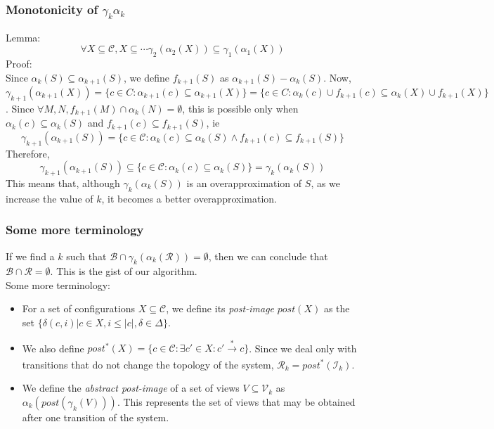 \documentclass{beamer}
\begin{document}
{        \begin{frame}
            \frametitle{Monotonicity of $\gamma_{k}\alpha_{k}$}
            Lemma:
            \begin{equation*}
                \forall X \subseteq \mathcal{C}, X \subseteq \cdots \gamma_{2}(\alpha_{2}(X)) \subseteq \gamma_{1}(\alpha_{1}(X))
            \end{equation*}
            Proof:\\
            Since $\alpha_{k}(S) \subseteq \alpha_{k + 1}(S)$, we define $f_{k + 1}(S)$ as $\alpha_{k + 1}(S) - \alpha_{k}(S)$.
            Now, $\gamma_{k + 1}(\alpha_{k + 1}(X)) = \{c \in C: \alpha_{k + 1}(c) \subseteq \alpha_{k + 1}(X)\} = \{c \in C: \alpha_{k}(c) \cup f_{k + 1}(c) \subseteq \alpha_{k}(X) \cup f_{k + 1}(X)\}$.
            Since $\forall M, N, f_{k+1}(M) \cap \alpha_{k}(N) = \emptyset$, this is possible only when $\alpha_{k}(c) \subseteq \alpha_{k}(S)$ and $f_{k+1}(c) \subseteq f_{k + 1}(S)$, ie 
            \begin{equation*}
                \gamma_{k + 1}(\alpha_{k + 1}(S)) = \{c \in \mathcal{C}: \alpha_{k}(c) \subseteq \alpha_{k}(S) \land f_{k + 1}(c) \subseteq f_{k + 1}(S)\}
            \end{equation*}
            Therefore, 
            \begin{equation*}
                \gamma_{k + 1}(\alpha_{k + 1}(S)) \subseteq \{c \in \mathcal{C}: \alpha_{k}(c) \subseteq \alpha_{k}(S)\} = \gamma_{k}(\alpha_{k}(S))
            \end{equation*}
            This means that, although $\gamma_{k}(\alpha_{k}(S))$ is an overapproximation of $S$, as we increase the value of $k$, it becomes a better overapproximation. 
        \end{frame}

        \begin{frame}
            \frametitle{Some more terminology}
            If we find a $k$ such that $\mathcal{B} \cap \gamma_{k}(\alpha_{k}(\mathcal{R})) = \emptyset$, then we can conclude that $\mathcal{B} \cap \mathcal{R} = \emptyset$. This is the gist of our algorithm.\\
            Some more terminology:
            \begin{itemize}
                \item For a set of configurations $X \subseteq \mathcal{C}$, we define its \textit{post-image} $post(X)$ as the set $\{\delta(c, i) | c \in X, i \leq |c|, \delta \in \Delta\}$.
                \item We also define $post^{*}(X) = \{c \in \mathcal{C} : \exists c' \in X : c' \xrightarrow[]{*} c \}$. Since we deal only with transitions that do not change the topology of the system, $\mathcal{R}_{k} = post^{*}(\mathcal{I}_{k})$.
                \item We define the \textit{abstract post-image} of a set of views $V \subseteq \mathcal{V}_{k}$ as $\alpha_{k}(post(\gamma_{k}(V)))$. This represents the set of views that may be obtained after one transition of the system.
            \end{itemize}
        \end{frame}
    }
\end{document}
